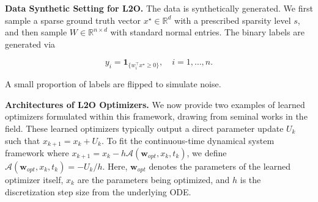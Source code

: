 \documentclass{article}
\begin{document}

\textbf{Data Synthetic Setting for L2O.}
The data is synthetically generated. We first sample a sparse ground truth vector $x^\star \in \mathbb{R}^d$ with a prescribed sparsity level $s$, and then sample $W \in \mathbb{R}^{n \times d}$ with standard normal entries. The binary labels are generated via

$$
y_i = \mathbf{1}_{\{w_i^\top x^\star \geq 0\}}, \quad i = 1, \dots, n.
$$

A small proportion of labels are flipped to simulate noise.

\textbf{Architectures of L2O Optimizers.}
We now provide two examples of learned optimizers formulated within this framework, drawing from seminal works in the field. These learned optimizers typically output a direct parameter update $U_k$ such that $x_{k+1} = x_k + U_k$. To fit the continuous-time dynamical system framework where $x_{k+1} = x_k - h\mathcal{A}(\mathbf{w}_{opt}, x_k, t_k)$, we define $\mathcal{A}(\mathbf{w}_{opt}, x_k, t_k) = -U_k/h$. Here, $\mathbf{w}_{opt}$ denotes the parameters of the learned optimizer itself, $x_k$ are the parameters being optimized, and $h$ is the discretization step size from the underlying ODE.
\end{document}
